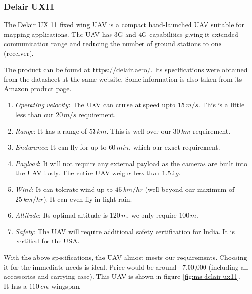 \subsubsection*{Delair UX11}

The Delair UX 11 fixed wing UAV is a compact hand-launched UAV suitable for mapping applications. The UAV has 3G and 4G capabilities giving it extended communication range and reducing the number of ground stations to one (receiver).

The product can be found at \href{https://delair.aero/delair-commercial-drones/professional-mapping-drone-delair-ux11/}{https://delair.aero/}. Its specifications were obtained from the datasheet at the same website. Some information is also taken from its Amazon product page.

\begin{enumerate}
    \item \textit{Operating velocity}: The UAV can cruise at speed upto $15\,m/s$. This is a little less than our $20\,m/s$ requirement.
    \item \textit{Range}: It has a range of $53\,km$. This is well over our $30\,km$ requirement.
    \item \textit{Endurance}: It can fly for up to $60\,min$, which our exact requirement.
    \item \textit{Payload}: It will not require any external payload as the cameras are built into the UAV body. The entire UAV weighs less than $1.5\,kg$.
    \item \textit{Wind}: It can tolerate wind up to $45\,km/hr$ (well beyond our maximum of $25\,km/hr$). It can even fly in light rain.
    \item \textit{Altitude}: Its optimal altitude is $120\,m$, we only require $100\,m$.
    \item \textit{Safety}: The UAV will require additional safety certification for India. It is certified for the USA.
\end{enumerate}

With the above specifications, the UAV almost meets our requirements. Choosing it for the immediate needs is ideal. Price would be around \rupee~7,00,000 (including all accessories and carrying case). This UAV is shown in figure \ref{fig:ms-delair-ux11}. It has a $110\,cm$ wingspan.

